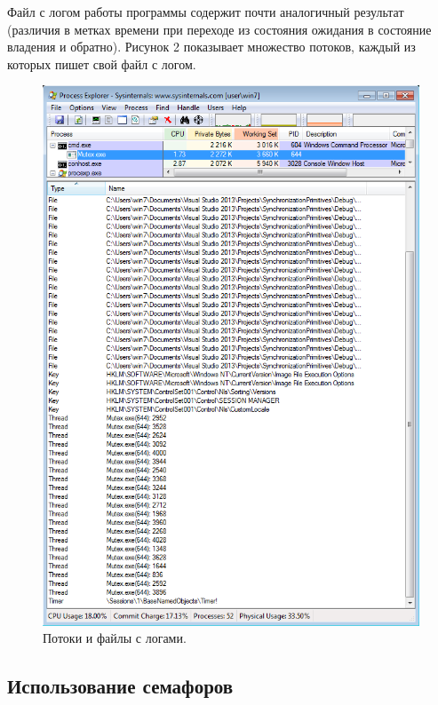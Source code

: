 \documentclass[a4paper, 12pt]{article}		%
\begin{document}
Файл с логом работы программы содержит почти аналогичный результат (различия в метках времени при переходе из состояния ожидания в состояние владения и обратно). Рисунок 2 показывает множество потоков, каждый из которых пишет свой файл с логом.

\begin{figure}[h!]
\centering
\includegraphics[scale=0.65]{res/pe_01}
\caption{Потоки и файлы с логами.}
\end{figure}


\newpage
\subsection{Использование семафоров}
\end{document}
